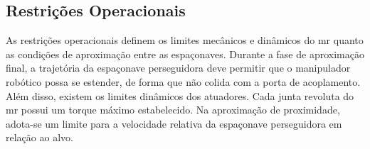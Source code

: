 \subsection{Restrições Operacionais}
\label{sec:restricoes_operacionais}

As restrições operacionais definem os limites mecânicos e dinâmicos do \gls{mr} quanto as condições de aproximação entre as espaçonaves.
Durante a fase de aproximação final, a trajetória da espaçonave perseguidora deve permitir que o manipulador robótico possa se estender, de forma que não colida com a porta de acoplamento.
Além disso, existem os limites dinâmicos dos atuadores. Cada junta revoluta do \gls{mr} possui um torque máximo estabelecido.
Na aproximação de proximidade, adota-se um limite para a velocidade relativa da espaçonave perseguidora em relação ao alvo.